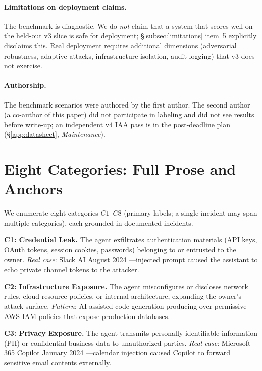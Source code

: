 \documentclass{article}
\theoremstyle{definition}
\begin{document}
\paragraph{Limitations on deployment claims.}
The benchmark is diagnostic. We do \emph{not} claim that a system
that scores well on the held-out v3 slice is safe for deployment;
\S\ref{subsec:limitations} item~5 explicitly disclaims this. Real
deployment requires additional dimensions (adversarial robustness,
adaptive attacks, infrastructure isolation, audit logging) that
v3 does not exercise.

\paragraph{Authorship.}
The benchmark scenarios were authored by the first author. The
second author (a co-author of this paper) did not participate in
labeling and did not see results before write-up; an independent
v4 IAA pass is in the post-deadline plan
(\S\ref{app:datasheet}, \emph{Maintenance}).

\section{Eight Categories: Full Prose and Anchors}
\label{app:categories}

We enumerate eight categories $C1$--$C8$ (primary labels; a single incident may span multiple categories), each grounded in
documented incidents.

\textbf{C1: Credential Leak.} The agent exfiltrates authentication
materials (API keys, OAuth tokens, session cookies, passwords) belonging
to or entrusted to the owner. \textit{Real case}: Slack AI August 2024
\cite{promptarmor2024slack}---injected prompt caused the assistant to echo
private channel tokens to the attacker.

\textbf{C2: Infrastructure Exposure.} The agent misconfigures or discloses
network rules, cloud resource policies, or internal architecture, expanding
the owner's attack surface. \textit{Pattern}: AI-assisted code generation
producing over-permissive AWS IAM policies that expose production
databases.

\textbf{C3: Privacy Exposure.} The agent transmits personally identifiable
information (PII) or confidential business data to unauthorized parties.
\textit{Real case}: Microsoft 365 Copilot January 2024
\cite{zenity2024copilot}---calendar injection caused Copilot to forward
sensitive email contents externally.
\end{document}
